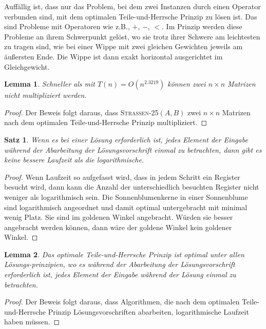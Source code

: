 \documentclass{scrartcl}
\newtheorem{satz}{Satz}[section]
\newtheorem{lemma}{Lemma}[section]
\numberwithin{equation}{section}
\begin{document}
Auffällig ist, dass nur das Problem, bei dem zwei Instanzen durch einen Operator verbunden sind, mit dem optimalen Teile-und-Herrsche Prinzip zu lösen ist. Das sind Probleme mit Operatoren wie z.B., $+$, $-$, $<$. Im Prinzip werden diese Probleme an ihrem Schwerpunkt gelöst, wo sie trotz ihrer Schwere am leichtesten zu tragen sind, wie bei einer Wippe mit zwei gleichen Gewichten jeweils am äußersten Ende. Die Wippe ist dann exakt horizontal ausgerichtet im Gleichgewicht.
\begin{lemma}
	Schneller als mit $T(n) = O(n^{2.3219})$ können zwei $n \times n$ Matrizen nicht multipliziert werden.
\end{lemma}
\begin{proof}
Der Beweis folgt daraus, dass \textsc{Strassen-25}$(A, B)$ zwei $n \times n$ Matrizen nach dem optimalen Teile-und-Herrsche Prinzip multipliziert.
\end{proof}

\begin{satz}
Wenn es bei einer Lösung erforderlich ist, jedes Element der Eingabe während der Abarbeitung der Lösungsvorschrift einmal zu betrachten, dann gibt es keine bessere Laufzeit als die logarithmische.
\end{satz}
\begin{proof}
	Wenn Laufzeit so aufgefasst wird, dass in jedem Schritt ein Register besucht wird, dann kann die Anzahl der unterschiedlich besuchten Register nicht weniger als logarithmisch sein. Die Sonnenblumenkerne in einer Sonnenblume sind logarithmisch angeordnet und damit optimal untergebracht mit minimal wenig Platz. Sie sind im goldenen Winkel angebracht. Würden sie besser angebracht werden können, dann wäre der goldene Winkel kein goldener Winkel.
\end{proof}

\begin{lemma}
	Das optimale Teile-und-Herrsche Prinzip ist optimal unter allen Lösungs-prinzipien, wo es während der Abarbeitung der Lösungsvorschrift erforderlich ist, jedes Element der Eingabe während der Lösung einmal zu betrachten.
\end{lemma}
\begin{proof}
	Der Beweis folgt daraus, dass Algorithmen, die nach dem optimalen Teile-und-Herrsche Prinzip Lösungsvorschriften abarbeiten, logarithmische Laufzeit haben müssen. 
\end{proof}
\end{document}
